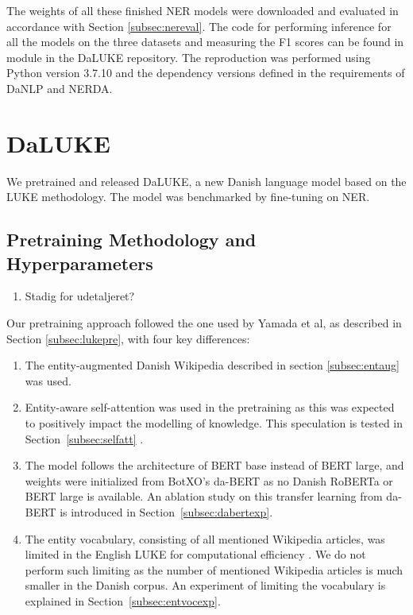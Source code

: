 \documentclass[main.tex]{subfiles}
\begin{document}
\noindent
The weights of all these finished NER models were downloaded and evaluated in accordance with Section \ref{subsec:nereval}.
The code for performing inference for all the models on the three datasets and measuring the F1 scores can be found in module  in the DaLUKE repository\footnotemark.
The reproduction was performed using Python version 3.7.10 and the dependency versions defined in the requirements of DaNLP and NERDA.
\section{DaLUKE}

We pretrained and released DaLUKE, a new Danish language model based on the LUKE methodology.
The model was benchmarked by fine-tuning on NER.

\subsection{Pretraining Methodology and Hyperparameters}%
\label{sub:dalpre}
\begin{enumerate}
    \item Stadig for udetaljeret?
\end{enumerate}
Our pretraining approach followed the one used by Yamada et al, as described in Section \ref{subsec:lukepre}, with four key differences:
\begin{enumerate}
    \item The entity-augmented Danish Wikipedia described in section \ref{subsec:entaug} was used.
    \item Entity-aware self-attention was used in the pretraining as this was expected to positively impact the modelling of knowledge. This speculation is tested in Section~\ref{subsec:selfatt} .
    \item 
        The model follows the architecture of BERT base instead of BERT large, and weights were initialized from BotXO's da-BERT \cite{botxo2019dabert} as no Danish RoBERTa or BERT large is available.
        An ablation study on this transfer learning from da-BERT is introduced in Section~\ref{subsec:dabertexp}.
    \item
        The entity vocabulary, consisting of all mentioned Wikipedia articles, was limited in the English LUKE for computational efficiency \cite[Sec. 3.4]{yamada2020luke}.
        We do not perform such limiting as the number of mentioned Wikipedia articles is much smaller in the Danish corpus.
        An experiment of limiting the vocabulary is explained in Section~\ref{subsec:entvocexp}.
\end{enumerate}
\end{document}
